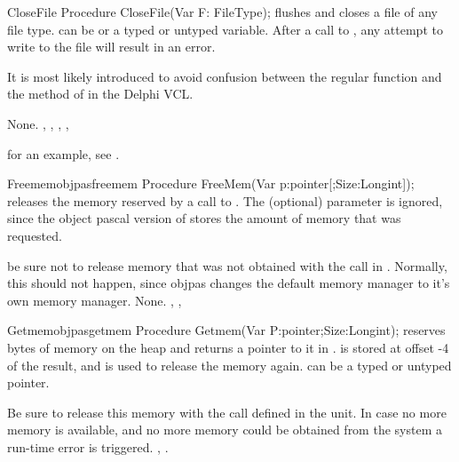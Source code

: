 \documentclass{report}
\begin{document}

\begin{procedure}{CloseFile}
\Declaration
Procedure CloseFile(Var F: FileType);
\Description
{} flushes and closes a file  of any file type. 
 can be   or a typed or untyped  variable. 
After a call to , any attempt to write to the file 
will result in an error.

It is most likely introduced to avoid confusion between the regular 
 function and the  method of  
in the Delphi VCL.

\Errors
None.
\SeeAlso
{}, , , , 
\end{procedure}

for an example, see .

\begin{procedurel}{Freemem}{objpasfreemem}
\Declaration
Procedure FreeMem(Var p:pointer[;Size:Longint]);
\Description
{} releases the memory reserved by a call to
. The (optional)  parameter is
ignored, since the object pascal version of  stores the amount
of memory that was requested. 

be sure not to release memory that was not obtained with the 
call in . Normally, this should not happen, since objpas
changes the default memory manager to it's own memory manager.
\Errors
None.
\SeeAlso
{}, , 
\end{procedurel}


\begin{procedurel}{Getmem}{objpasgetmem}
\Declaration
Procedure Getmem(Var P:pointer;Size:Longint);
\Description
{} reserves  bytes of memory on the heap and returns
a pointer to it in .  is stored at offset -4 of the 
result, and is used to release the memory again.  can be a typed or
untyped pointer.

Be sure to release this memory with the  call
defined in the  unit.
\Errors
In case no more memory is available, and no more memory could be obtained
from the system a run-time error is triggered.
\SeeAlso
{}, .
\end{procedurel}
\end{document}
